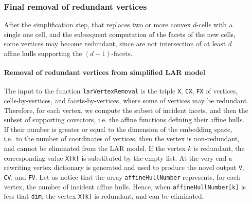 \documentclass[11pt,oneside]{article}	%
\begin{document}
\subsubsection{Final removal of redundant vertices}

After the simplification step, that replaces two or more convex $d$-cells with a single one cell,
and the subsequent computation of the facets of the new cells, some vertices may become redundant,
since are not intersection of at least $d$ affine hulls supporting the $(d-1)$-facets.

\paragraph{Removal of redundant vertices from simplified LAR model}

The input to the function \texttt{larVertexRemoval} is the triple \texttt{X}, \texttt{CX}, \texttt{FX} of vertices, cells-by-vertices, and facets-by-vertices, where some of vertices may be redundant.
Therefore, for each vertex, we compute the subset of incident facets, and then the subset of supporting covectors, i.e. the affine functions defining their affine hulls. If their number is greater or equal to the dimension of the embedding space, i.e.~to the number of coordinates of vertices,  then the vertex is non-redundant, and cannot be eliminated from the LAR model. If the vertex $k$ is redundant, the corresponding value \texttt{X[k]} is substituted by the empty list. At the very end a rewriting vertex dictionary is generated and used to produce the novel output \texttt{V}, \texttt{CV}, and \texttt{FV}.
Let us notice that the array \texttt{affineHullNumber} represents, for each vertex, the number of incident affine hulls. Hence, when \texttt{affineHullNumber[k]} is less that \texttt{dim}, the vertex \texttt{X[k]} is redundant, and can be eliminated.
\end{document}
